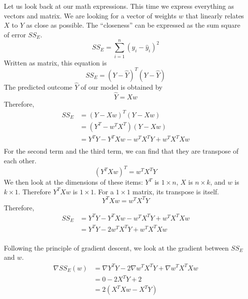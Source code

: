 \documentclass[
	letterpaper
]{article}
\begin{document}
Let us look back at our math expressions.
This time we express everything as vectors and matrix.
We are looking for a vector of weights $w$ that linearly relates $X$ to $Y$ as close as possible.
The ``closeness'' can be expressed as the sum square of error $SS_E$.
\begin{equation}
SS_E = \sum_{i = 1}^n (y_i - \hat y_i) ^2
\end{equation}
Written as matrix, this equation is 
\begin{equation}
SS_E = (Y - \hat Y)^T (Y - \hat Y)
\end{equation}
The predicted outcome $\hat Y$ of our model is obtained by
\begin{equation}
\hat Y =  X w
\end{equation}
Therefore, 
\begin{equation}
\begin{split}
SS_E & = (Y - X w)^T (Y - X w)\\
 & = (Y^T -  w^TX^T)(Y- X w)\\
 & = Y^TY -Y^TX w - w^TX^TY + w^TX^T X w\\
\end{split}
\end{equation}
For the second term and the third term, we can find that they are transpose of each other.
\begin{equation}
(Y^T X w)^T = w^T X^T Y
\end{equation}
We then look at the dimensions of these items:
$Y^T$ is $1\times n$, $X$ is $n\times k$, and $w$ is $k \times 1$.
Therefore $Y^T X w$ is $1\times 1$.
For a $1\times 1$ matrix, its transpose is itself.
\begin{equation}
Y^T X w = w^T X^T Y
\end{equation}
Therefore,
\begin{equation}
\begin{split}
SS_E & = Y^T Y -Y^T X w - w^T X^T Y + w^T X^T X w\\
& = Y^T Y - 2w^T X^T Y + w^T X^T X w\\
\end{split}
\end{equation}

Following the principle of gradient descent, we look at the gradient between $SS_E$ and $w$.
\begin{equation}
\begin{split}
\nabla SS_E(w) & = \nabla Y^T Y - 2 \nabla w^T X^T Y + \nabla w^T X^T X w\\
& = 0 - 2X^T Y + 2 \\
& = 2(X^T X w - X^T Y )\\
\end{split}
\end{equation}
\end{document}
